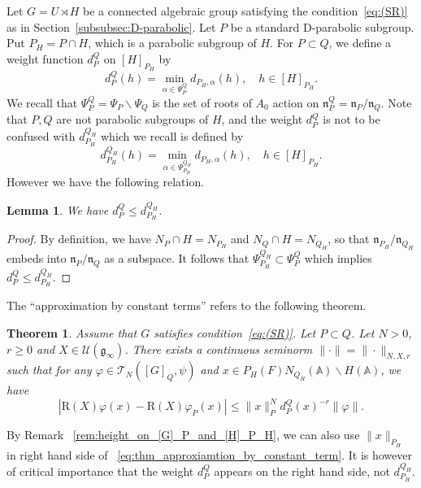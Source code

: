 \documentclass[letterpaper,11pt]{amsart}
\newcommand{\fg}{\mathfrak{g}}
\newcommand{\fn}{\mathfrak{n}}
\newcommand{\bA}{\mathbb{A}}
\newcommand{\cT}{\mathcal{T}}
\newcommand{\cU}{\mathcal{U}}
\newcommand{\bs}{\backslash}
\newcommand{\<}{\negthickspace}
\theoremstyle{definition}
\theoremstyle{plain}
\newtheorem{theorem}[definition]{Theorem}
\newtheorem{lemma}[definition]{Lemma}
\theoremstyle{remark}
\numberwithin{equation}{section}
\begin{document}
Let $G = U \rtimes H$ be a connected algebraic group satisfying the
condition~\eqref{eq:(SR)} as in Section~\ref{subsubsec:D-parabolic}.
Let $P$ be a standard D-parabolic subgroup. Put $P_H = P \cap H$, which is a parabolic subgroup of $H$. For $P \subset Q$, we define a weight
function $d_P^Q$ on $[H]_{P_H}$ by
    \begin{equation}  \label{eq:weight_d_P_Q}
    d_P^Q(h) = \min_{\alpha \in \Psi_P^Q} d_{P_H,\alpha}(h), \quad h \in [H]_{P_H}.
    \end{equation}
We recall that $\Psi_P^Q = \Psi_P \bs \Psi_Q$ is the set of roots of $A_0$ action on $\fn_P^Q = \fn_P/\fn_Q$. Note that $P, Q$ are not parabolic subgroups of $H$, and the weight $d_P^Q$ is not to be confused with $d_{P_H}^{Q_H}$ which we recall is defined by
    \[
    d_{P_H}^{Q_H}(h) = \min_{\alpha \in \Psi_{P_H}^{Q_H}} d_{P_H,\alpha}(h), \quad h \in [H]_{P_H}.
    \]
However we have the following relation.

\begin{lemma}   \label{lemma:weight_restriction}
We have $d_P^Q \le d_{P_H}^{Q_H}$.
\end{lemma}

\begin{proof}
By definition, we have $N_P \cap H = N_{P_H}$ and $N_Q \cap H =
N_{Q_H}$, so that $\fn_{P_H}/\fn_{Q_H}$ embeds into $\fn_P/\fn_Q$ as a subspace. It follows that $\Psi_{P_H}^{Q_H} \subset \Psi_{P}^Q$ which implies $d_P^Q \le d_{P_H}^{Q_H}$.
\end{proof}

The ``approximation by constant terms'' refers to the following theorem.

\begin{theorem} \label{thm:approximation_by_constant_term}
Assume that $G$ satisfies condition~\eqref{eq:(SR)}. Let $P \subset Q$. Let $N>0$, $r \ge 0$ and $X \in \cU(\fg_\infty)$. There exists a continuous
seminorm $\| \cdot \|=\| \cdot \|_{N,X,r}$ such that for any $\varphi \in
\cT_N([G]_Q, \psi)$ and $x \in P_H(F) N_{Q_H}(\bA) \bs H(\bA)$, we have
    \begin{equation} \label{eq:thm_approxiamtion_by_constant_term}
      \left| \mathrm{R}(X) \varphi(x) - \mathrm{R}(X) \varphi_P(x) \right|
    \le \|x\|_{P}^N d_P^Q(x)^{-r} \| \varphi \|.
    \end{equation}
\end{theorem}

By Remark ~\ref{rem:height_on_[G]_P_and_[H]_P_H}, we can also use $\| x \|_{P_H}$ in right hand side of ~\ref{eq:thm_approxiamtion_by_constant_term}.
It is however of critical importance that the weight $d_P^Q$ appears on the right hand side, not $d_{P_H}^{Q_H}$.
\end{document}
